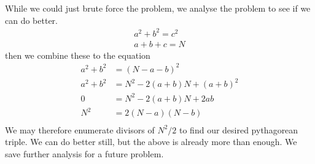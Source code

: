 While we could just brute force the problem, we analyse the problem to see if we can do better.
$$\begin{matrix}
    a^2+b^2=c^2\\
    a+b+c=N
\end{matrix}$$
then we combine these to the equation
$$\begin{align*}
    a^2+b^2&=(N-a-b)^2\\
    a^2+b^2&=N^2-2(a+b)N+(a+b)^2\\
    0&=N^2-2(a+b)N+2ab\\
    N^2&=2(N-a)(N-b)\\
\end{align*}$$
We may therefore enumerate divisors of $N^2/2$ to find our desired pythagorean triple. We can do better still, but the above
is already more than enough. We save further analysis for a future problem.